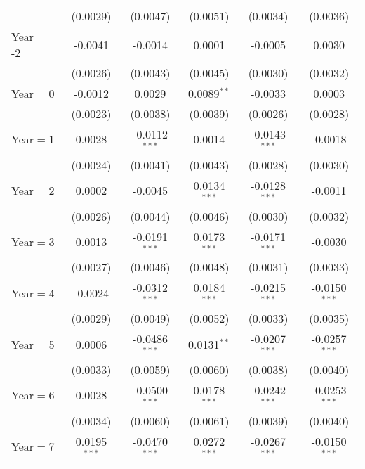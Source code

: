 \begin{table}[htbp]
\begin{tabular}{lccccc}
                           & (0.0029)        & (0.0047)        & (0.0051)       & (0.0034)        & (0.0036)\\
      Year$=$-2            & -0.0041         & -0.0014         & 0.0001         & -0.0005         & 0.0030\\
                           & (0.0026)        & (0.0043)        & (0.0045)       & (0.0030)        & (0.0032)\\
      Year$=$0             & -0.0012         & 0.0029          & 0.0089$^{**}$  & -0.0033         & 0.0003\\
                           & (0.0023)        & (0.0038)        & (0.0039)       & (0.0026)        & (0.0028)\\
      Year$=$1             & 0.0028          & -0.0112$^{***}$ & 0.0014         & -0.0143$^{***}$ & -0.0018\\
                           & (0.0024)        & (0.0041)        & (0.0043)       & (0.0028)        & (0.0030)\\
      Year$=$2             & 0.0002          & -0.0045         & 0.0134$^{***}$ & -0.0128$^{***}$ & -0.0011\\
                           & (0.0026)        & (0.0044)        & (0.0046)       & (0.0030)        & (0.0032)\\
      Year$=$3             & 0.0013          & -0.0191$^{***}$ & 0.0173$^{***}$ & -0.0171$^{***}$ & -0.0030\\
                           & (0.0027)        & (0.0046)        & (0.0048)       & (0.0031)        & (0.0033)\\
      Year$=$4             & -0.0024         & -0.0312$^{***}$ & 0.0184$^{***}$ & -0.0215$^{***}$ & -0.0150$^{***}$\\
                           & (0.0029)        & (0.0049)        & (0.0052)       & (0.0033)        & (0.0035)\\
      Year$=$5             & 0.0006          & -0.0486$^{***}$ & 0.0131$^{**}$  & -0.0207$^{***}$ & -0.0257$^{***}$\\
                           & (0.0033)        & (0.0059)        & (0.0060)       & (0.0038)        & (0.0040)\\
      Year$=$6             & 0.0028          & -0.0500$^{***}$ & 0.0178$^{***}$ & -0.0242$^{***}$ & -0.0253$^{***}$\\
                           & (0.0034)        & (0.0060)        & (0.0061)       & (0.0039)        & (0.0040)\\
      Year$=$7             & 0.0195$^{***}$  & -0.0470$^{***}$ & 0.0272$^{***}$ & -0.0267$^{***}$ & -0.0150$^{***}$\\

\end{tabular}
\end{table}
